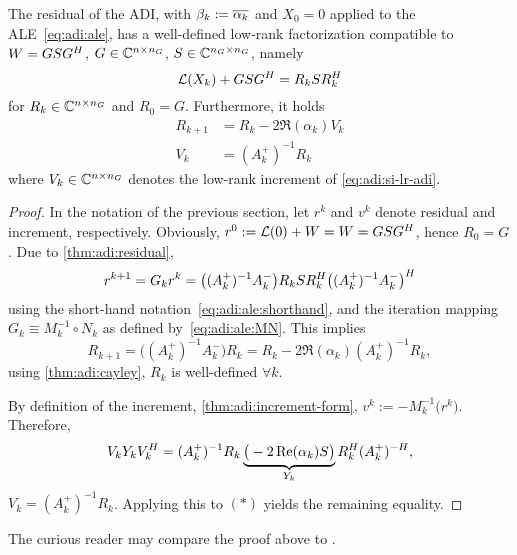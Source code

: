 \begin{theorem}
\label{thm:adi:lowrank-residual}
  The residual of the \ac{ADI},
  with $\beta_k := \conj{\alpha_k}$ and $X_0=0$ applied to the \ac{ALE}~\eqref{eq:adi:ale},
  has a well-defined low-rank factorization compatible to $W = GSG^H$,
  $G\in\mathbb{C}^{n\times n_G}$, $S\in\mathbb{C}^{n_G\times n_G}$, namely
  \begin{equation*}
    \operatorname{\mathcal L}(X_k) + G S G^H = R_k S R_k^H
  \end{equation*}
  for $R_k \in\mathbb{C}^{n\times n_G}$ and $R_0 = G$.
  Furthermore, it holds
  \begin{align*}
    R_{k+1} &= R_k - 2\Re(\alpha_k) V_k \\
    V_k &= (A_k^+)^{-1} R_k
  \end{align*}
  where $V_k \in\mathbb{C}^{n\times n_G}$ denotes the low-rank increment of \eqref{eq:adi:si-lr-adi}.
\end{theorem}
\begin{proof}
  In the notation of the previous section,
  let $r^k$ and $v^k$ denote residual and increment, respectively.
  Obviously, $r^0 := \operatorname{\mathcal L}(0) + W = W = GSG^H$, hence $R_0 = G$.
  Due to \autoref{thm:adi:residual},
  \begin{equation*}
    r^{k+1}
    = G_k r^k
    = \big( (A_k^+)^{-1} A_k^- \big)
    R_k S R_k^H
    \big( (A_k^+)^{-1} A_k^- \big)^H
  \end{equation*}
  using the short-hand notation~\eqref{eq:adi:ale:shorthand},
  and the iteration mapping $G_k \equiv M_k^{-1} \circ N_k$ as defined by~\eqref{eq:adi:ale:MN}.
  This implies
  \begin{equation*}
  \tag{$\ast$}
    R_{k+1}
    = \big( (A_k^+)^{-1} A_k^- \big) R_k
    = R_k - 2\Re(\alpha_k) (A_k^+)^{-1} R_k
    ,
  \end{equation*}
  using \autoref{thm:adi:cayley},
  \ie $R_k$ is well-defined $\forall k$.

  By definition of the increment,
  \cf \autoref{thm:adi:increment-form},
  $v^k := -M_k^{-1} \big( r^k \big)$.
  Therefore,
  \begin{equation*}
    V_k Y_k V_k^H
    = (A_k^+)^{-1} R_k
    \underbrace{
      \big( -2 \operatorname{Re}(\alpha_k) S \big)
    }_{Y_k}
    R_k^H (A_k^+)^{-H}
    ,
  \end{equation*}
  \ie $V_k = (A_k^+)^{-1} R_k$.
  Applying this to $(\ast)$ yields the remaining equality.
\end{proof}

\begin{remark}
  The curious reader may compare the proof above to \cite[Theorem~3.5]{Kuerschner2016}.
\end{remark}

